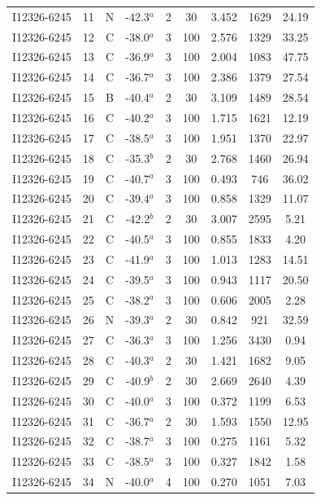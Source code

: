 \begin{table}
\begin{tabular}{ccccccccc}
I12326-6245 & 11 & N & -42.3$^{a}$ & 2 & 30 & 3.452 & 1629 & 24.19 \\
I12326-6245 & 12 & C & -38.0$^{a}$ & 3 & 100 & 2.576 & 1329 & 33.25 \\
I12326-6245 & 13 & C & -36.9$^{a}$ & 3 & 100 & 2.004 & 1083 & 47.75 \\
I12326-6245 & 14 & C & -36.7$^{a}$ & 3 & 100 & 2.386 & 1379 & 27.54 \\
I12326-6245 & 15 & B & -40.4$^{a}$ & 2 & 30 & 3.109 & 1489 & 28.54 \\
I12326-6245 & 16 & C & -40.2$^{a}$ & 3 & 100 & 1.715 & 1621 & 12.19 \\
I12326-6245 & 17 & C & -38.5$^{a}$ & 3 & 100 & 1.951 & 1370 & 22.97 \\
I12326-6245 & 18 & C & -35.3$^{b}$ & 2 & 30 & 2.768 & 1460 & 26.94 \\
I12326-6245 & 19 & C & -40.7$^{a}$ & 3 & 100 & 0.493 & 746 & 36.02 \\
I12326-6245 & 20 & C & -39.4$^{a}$ & 3 & 100 & 0.858 & 1329 & 11.07 \\
I12326-6245 & 21 & C & -42.2$^{b}$ & 2 & 30 & 3.007 & 2595 & 5.21 \\
I12326-6245 & 22 & C & -40.5$^{a}$ & 3 & 100 & 0.855 & 1833 & 4.20 \\
I12326-6245 & 23 & C & -41.9$^{a}$ & 3 & 100 & 1.013 & 1283 & 14.51 \\
I12326-6245 & 24 & C & -39.5$^{a}$ & 3 & 100 & 0.943 & 1117 & 20.50 \\
I12326-6245 & 25 & C & -38.2$^{a}$ & 3 & 100 & 0.606 & 2005 & 2.28 \\
I12326-6245 & 26 & N & -39.3$^{a}$ & 2 & 30 & 0.842 & 921 & 32.59 \\
I12326-6245 & 27 & C & -36.3$^{a}$ & 3 & 100 & 1.256 & 3430 & 0.94 \\
I12326-6245 & 28 & C & -40.3$^{a}$ & 2 & 30 & 1.421 & 1682 & 9.05 \\
I12326-6245 & 29 & C & -40.9$^{b}$ & 2 & 30 & 2.669 & 2640 & 4.39 \\
I12326-6245 & 30 & C & -40.0$^{a}$ & 3 & 100 & 0.372 & 1199 & 6.53 \\
I12326-6245 & 31 & C & -36.7$^{a}$ & 2 & 30 & 1.593 & 1550 & 12.95 \\
I12326-6245 & 32 & C & -38.7$^{a}$ & 3 & 100 & 0.275 & 1161 & 5.32 \\
I12326-6245 & 33 & C & -38.5$^{a}$ & 3 & 100 & 0.327 & 1842 & 1.58 \\
I12326-6245 & 34 & N & -40.0$^{a}$ & 4 & 100 & 0.270 & 1051 & 7.03 \\

\end{tabular}
\end{table}
